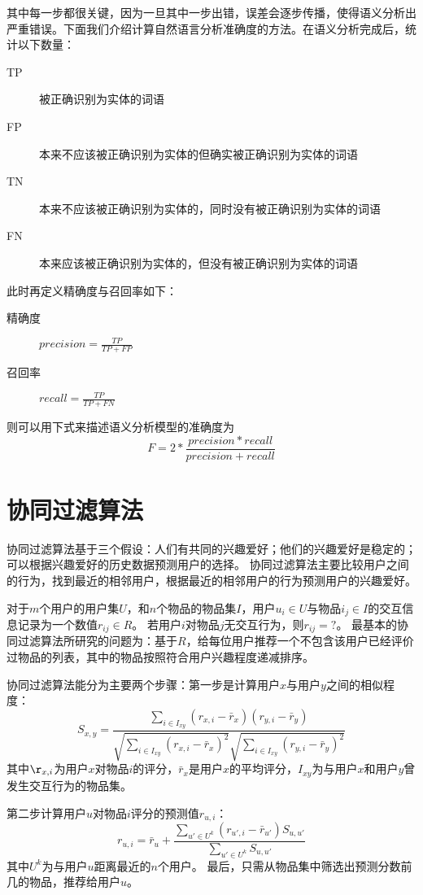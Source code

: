 其中每一步都很关键，因为一旦其中一步出错，误差会逐步传播，使得语义分析出严重错误。下面我们介绍计算自然语言分析准确度的方法。在语义分析完成后，统计以下数量：
\begin{center}
\begin{description}
	\item[TP]
	被正确识别为实体的词语
	\item[FP]
	本来不应该被正确识别为实体的但确实被正确识别为实体的词语
	\item[TN]
	本来不应该被正确识别为实体的，同时没有被正确识别为实体的词语
	\item[FN]
	本来应该被正确识别为实体的，但没有被正确识别为实体的词语
\end{description}
\end{center}
此时再定义精确度与召回率如下：
\begin{center}
\begin{description}
	\item[精确度]
	$precision= \frac{TP}{TP+FP} $
	\item[召回率]
	$recall= \frac{TP}{TP+FN} $
\end{description}
\end{center}
则可以用下式来描述语义分析模型的准确度为
\[
F= 2* \frac{precision*recall}{precision+recall}
\]
\section{协同过滤算法}
协同过滤算法基于三个假设：人们有共同的兴趣爱好；他们的兴趣爱好是稳定的；可以根据兴趣爱好的历史数据预测用户的选择。
协同过滤算法主要比较用户之间的行为，找到最近的相邻用户，根据最近的相邻用户的行为预测用户的兴趣爱好。

对于$m$个用户的用户集$U$，和$n$个物品的物品集$I$，用户$u_i \in U$与物品$i_j \in I$的交互信息记录为一个数值$r_{ij} \in R$。
若用户$i$对物品$j$无交互行为，则$r_{ij}=?$。
最基本的协同过滤算法所研究的问题为：基于$R$，给每位用户推荐一个不包含该用户已经评价过物品的列表，其中的物品按照符合用户兴趣程度递减排序。

协同过滤算法能分为主要两个步骤：第一步是计算用户$x$与用户$y$之间的相似程度：
\[
S_{x,y} = \frac{\sum_{i\in I_{xy}}(r_{x,i}-\bar{r}_x)(r_{y,i}-\bar{r}_y)}{\sqrt{\sum_{i\in I_{xy}}(r_{x,i}-\bar{r}_x)^2}\sqrt{\sum_{i\in I_{xy}}(r_{y,i}-\bar{r}_y)^2}}
\]
其中$\r_{x,i}$为用户$x$对物品$i$的评分，$\bar{r}_x$是用户$x$的平均评分，$I_{xy}$为与用户$x$和用户$y$曾发生交互行为的物品集。

第二步计算用户$u$对物品$i$评分的预测值$r_{u,i}$：
\[
r_{u,i} = \bar{r}_u + \frac{\sum_{u'\in U^k}(r_{u',i}-\bar{r}_{u'})S_{u,u'}}{\sum_{u'\in U^k}S_{u,u'}}
\]
其中$U^k$为与用户$u$距离最近的$n$个用户。
最后，只需从物品集中筛选出预测分数前几的物品，推荐给用户$u$。
